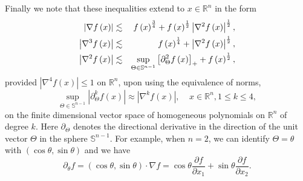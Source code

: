 \documentclass{amsart}
\theoremstyle{plain}
\numberwithin{equation}{section}
\begin{document}
Finally we note that these inequalities extend to $x\in \mathbb{R}^{n}$ in
the form%
\begin{eqnarray}
\left\vert \nabla f\left( x\right) \right\vert &\lesssim &f\left( x\right) ^{%
\frac{3}{4}}+f\left( x\right) ^{\frac{1}{2}}\left\vert \nabla ^{2}f\left(
x\right) \right\vert ^{\frac{1}{2}},  \label{nonneg n} \\
\left\vert \nabla ^{3}f\left( x\right) \right\vert &\lesssim &f\left(
x\right) ^{\frac{1}{4}}+\left\vert \nabla ^{2}f\left( x\right) \right\vert ^{%
\frac{1}{2}},  \notag \\
\left\vert \nabla ^{2}f\left( x\right) \right\vert &\lesssim &\sup_{\Theta
\in \mathbb{S}^{n-1}}\left[ \partial _{\Theta }^{2}f\left( x\right) \right]
_{+}+f\left( x\right) ^{\frac{1}{2}},  \notag
\end{eqnarray}%
provided $\left\vert \nabla ^{4}f\left( x\right) \right\vert \leq 1$ on $%
\mathbb{R}^{n}$, upon using the equivalence of norms, 
\begin{equation*}
\sup_{\Theta \in \mathbb{S}^{n-1}}\left\vert \partial _{\Theta }^{k}f\left(
x\right) \right\vert \approx \left\vert \nabla ^{k}f\left( x\right)
\right\vert ,\ \ \ \ \ x\in \mathbb{R}^{n},1\leq k\leq 4,
\end{equation*}%
on the finite dimensional vector space of homogeneous polynomials on $%
\mathbb{R}^{n}$ of degree $k$. Here $\partial _{\Theta }$ denotes the
directional derivative in the direction of the unit vector $\Theta $ in the
sphere $\mathbb{S}^{n-1}$. For example, when $n=2$, we can identify $\Theta
=\theta $ with $\left( \cos \theta ,\sin \theta \right) $ and we have 
\begin{equation*}
\partial _{\theta }f=\left( \cos \theta ,\sin \theta \right) \cdot \nabla
f=\cos \theta \frac{\partial f}{\partial x_{1}}+\sin \theta \frac{\partial f%
}{\partial x_{2}}.
\end{equation*}
\end{document}
